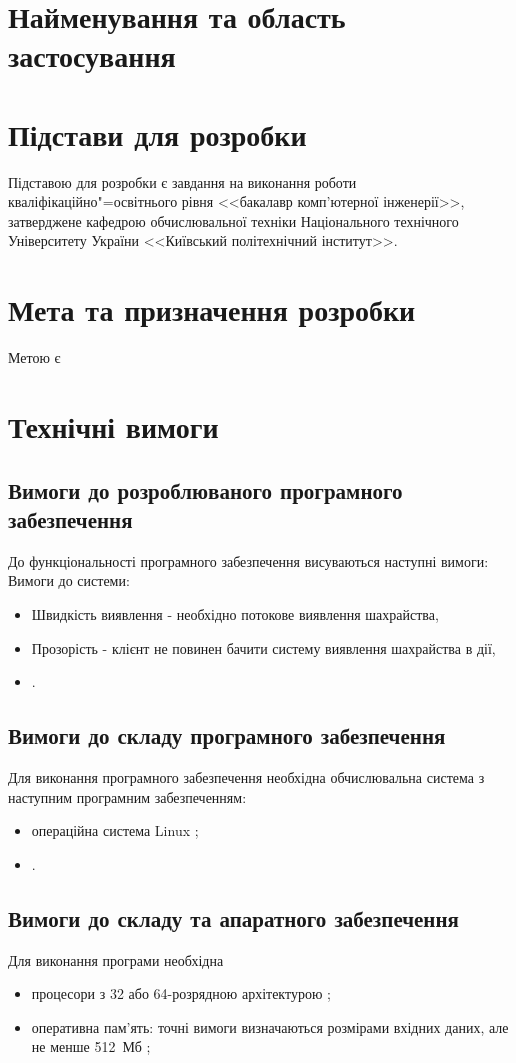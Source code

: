 \documentclass[ukrainian,utf8,pointsubsection,simple]{eskdtext}
\begin{document}
\newpage
{}
\tableofcontents
\newpage

\section{Найменування та область застосування}
\TBD

\section{Підстави для розробки}
\TBD Підставою для розробки є завдання на виконання роботи кваліфікаційно"=освітнього
рівня <<бакалавр комп'ютерної інженерії>>, затверджене кафедрою обчислювальної
техніки Національного технічного Університету України <<Київський політехнічний
інститут>>.

\section{Мета та призначення розробки}
Метою є \TBD

\section{Технічні вимоги}
\subsection{Вимоги до розроблюваного програмного забезпечення}
До функціональності програмного забезпечення висуваються наступні вимоги:
Вимоги до системи:

\begin{itemize}
  \item Швидкість виявлення - необхідно потокове виявлення шахрайства,
  \item Прозорість - клієнт не повинен бачити систему виявлення шахрайства в дії,
  \item \TBD.
\end{itemize}


\subsection{Вимоги до складу програмного забезпечення}
Для виконання програмного забезпечення необхідна обчислювальна система з
наступним програмним забезпеченням:
\begin{itemize}
\item операційна система Linux \TBD;

\item \TBD.
\end{itemize}

\subsection{Вимоги до складу та апаратного забезпечення}
Для виконання програми необхідна \TBD
\begin{itemize}
\item процесори з 32 або 64-розрядною архітектурою \TBD;

\item оперативна пам'ять: точні вимоги визначаються розмірами вхідних даних, але не менше 512~Мб \TBD;

\end{itemize}
\end{document}
